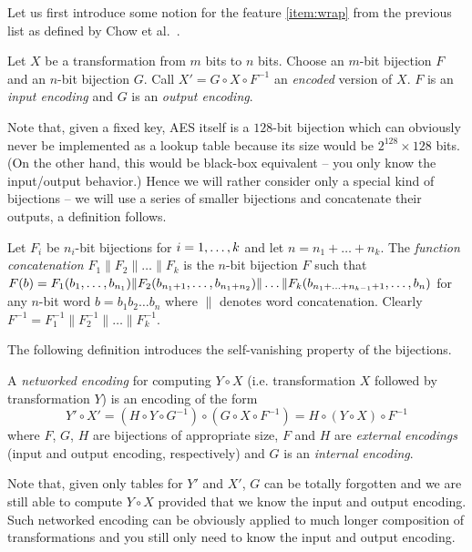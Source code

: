 Let us first introduce some notion for the feature \ref{item:wrap} from the previous list as defined by Chow et al.\ \cite{chow2003aes}.

\begin{defn}[Encoding]
	Let $X$ be a transformation from $m$ bits to $n$ bits. Choose an $m$-bit bijection $F$ and an $n$-bit bijection $G$. Call $X' = G \circ X \circ F^{-1}$ an {\em encoded} version of $X$. $F$ is an {\em input encoding} and $G$ is an {\em output encoding}.
\end{defn}

Note that, given a fixed key, AES itself is a $128$-bit bijection which can obviously never be implemented as a lookup table because its size would be $2^{128}\times 128$ bits. (On the other hand, this would be black-box equivalent -- you only know the input/output behavior.) Hence we will rather consider only a special kind of bijections -- we will use a series of smaller bijections and concatenate their outputs, a definition follows.

\begin{defn}
\label{def:concat}
	Let $F_i$ be $n_i$-bit bijections for $i=1 , \ldots , k$ and let $n = n_1 + \ldots + n_k$. The {\em function concatenation} $F_1 \| F_2 \| \ldots \| F_k$ is the $n$-bit bijection $F$ such that $F(b) = F_1(b_1 , \ldots , b_{n_1})\| F_2(b_{n_1+1} , \ldots , b_{n_1+n_2})\|\ldots\| F_k(b_{n_1+\ldots+n_{k-1}+1} , \ldots , b_n)$ for any $n$-bit word $b=b_1b_2\ldots b_n$ where $\|$ denotes word concatenation. Clearly $F^{-1} = F_1^{-1}\| F_2^{-1}\| \ldots \|F_k^{-1}$.
\end{defn}

The following definition introduces the self-vanishing property of the bijections.

\begin{defn}
\label{def:netw}
	A {\em networked encoding} for computing $Y\circ X$ (i.e. transformation $X$ followed by transformation $Y$) is an encoding of the form
	\[
		Y'\circ X' = (H\circ Y\circ G^{-1})\circ(G\circ X\circ F^{-1}) = H\circ(Y\circ X)\circ F^{-1}
	\]
	where $F$, $G$, $H$ are bijections of appropriate size, $F$ and $H$ are {\em external encodings} (input and output encoding, respectively) and $G$ is an {\em internal encoding}.
\end{defn}

Note that, given only tables for $Y'$ and $X'$, $G$ can be totally forgotten and we are still able to compute $Y\circ X$ provided that we know the input and output encoding. Such networked encoding can be obviously applied to much longer composition of transformations and you still only need to know the input and output encoding.


